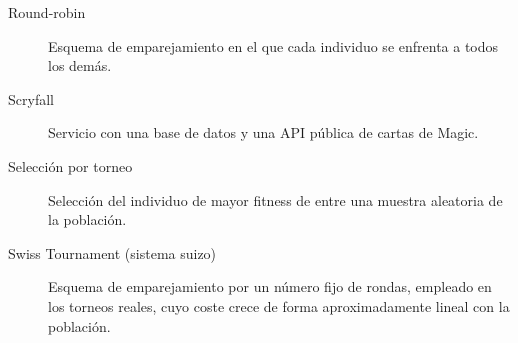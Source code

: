 \begin{description}
    \item[Round-robin] Esquema de emparejamiento en el que cada individuo se enfrenta a todos los demás.
    \item[Scryfall] Servicio con una base de datos y una API pública de cartas de Magic.
    \item[Selección por torneo] Selección del individuo de mayor fitness de entre una muestra aleatoria de la población.
    \item[Swiss Tournament (sistema suizo)] Esquema de emparejamiento por un número fijo de rondas, empleado en los torneos reales, cuyo coste crece de forma aproximadamente lineal con la población.
\end{description}
